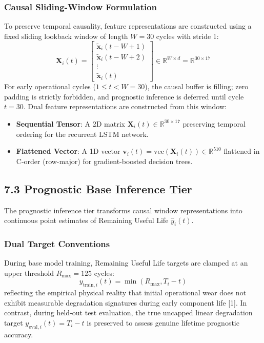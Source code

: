 \documentclass[12pt,a4paper]{article}
\begin{document}
\subsubsection*{Causal Sliding-Window Formulation}
To preserve temporal causality, feature representations are constructed using a fixed sliding lookback window of length $W = 30$ cycles with stride 1:
\begin{equation}
\mathbf{X}_i(t) = \begin{bmatrix}
\tilde{\mathbf{x}}_i(t - W + 1) \\
\tilde{\mathbf{x}}_i(t - W + 2) \\
\vdots \\
\tilde{\mathbf{x}}_i(t)
\end{bmatrix} \in \mathbb{R}^{W \times d} = \mathbb{R}^{30 \times 17}
\end{equation}
For early operational cycles ($1 \le t < W = 30$), the causal buffer is filling; zero padding is strictly forbidden, and prognostic inference is deferred until cycle $t = 30$. Dual feature representations are constructed from this window:
\begin{itemize}
    \item \textbf{Sequential Tensor}: A 2D matrix $\mathbf{X}_i(t) \in \mathbb{R}^{30 \times 17}$ preserving temporal ordering for the recurrent LSTM network.
    \item \textbf{Flattened Vector}: A 1D vector $\mathbf{v}_i(t) = \text{vec}(\mathbf{X}_i(t)) \in \mathbb{R}^{510}$ flattened in C-order (row-major) for gradient-boosted decision trees.
\end{itemize}

\subsection*{7.3 Prognostic Base Inference Tier}
The prognostic inference tier transforms causal window representations into continuous point estimates of Remaining Useful Life $\hat{y}_i(t)$.

\subsubsection*{Dual Target Conventions}
During base model training, Remaining Useful Life targets are clamped at an upper threshold $R_{\text{max}} = 125$ cycles:
\begin{equation}
y_{\text{train}, i}(t) = \min(R_{\text{max}}, T_i - t)
\end{equation}
reflecting the empirical physical reality that initial operational wear does not exhibit measurable degradation signatures during early component life [1]. In contrast, during held-out test evaluation, the true uncapped linear degradation target $y_{\text{eval}, i}(t) = T_i - t$ is preserved to assess genuine lifetime prognostic accuracy.
\end{document}

